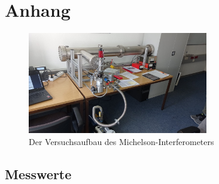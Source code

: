\newpage
\section{Anhang}

%  
\begin{figure}[h]
    \centering
    \includegraphics[width=0.7\textwidth]{latex/images/Aufbau.jpeg}
    \caption{Der Versuchsaufbau des Michelson-Interferometers}
\end{figure}


\subsection{Messwerte}

